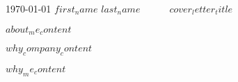 \documentclass[11pt, a4paper]{awesome-cv}
\begin{document}
\makecvheader[R]

\makecvfooter
  {\today}
  {$first_name$ $last_name$~~~\textperiodcentered~~~$cover_letter_title$}
  {}

\makelettertitle

\begin{cvletter}

$about_me_content$

$why_company_content$

$why_me_content$

\end{cvletter}


\makeletterclosing
\end{document}
